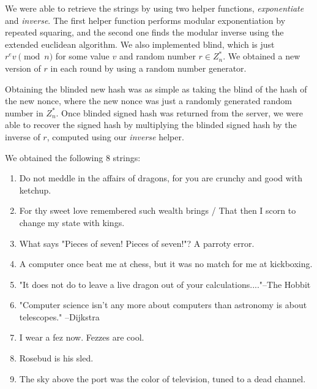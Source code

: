 
We were able to retrieve the strings by using two helper functions, \emph{exponentiate} and \emph{inverse}. The first helper function performs modular exponentiation by repeated squaring, and the second one finds the modular inverse using the extended euclidean algorithm. We also implemented blind, which is just $r^e v \pmod{n}$ for some value $v$ and random number $r \in Z_{n}^*$. We obtained a new version of $r$ in each round by using a random number generator.

Obtaining the blinded new hash was as simple as taking the blind of the hash of the new nonce, where the new nonce was just a randomly generated random number in $Z_{n}^*$. Once blinded signed hash was returned from the server, we were able to recover the signed hash by multiplying the blinded signed hash by the inverse of $r$, computed using our \emph{inverse} helper.

We obtained the following 8 strings:

\begin{enumerate}
  \item Do not meddle in the affairs of dragons, for you are crunchy and good with ketchup.
  \item For thy sweet love remembered such wealth brings / That then I scorn to change my state with kings.
  \item What says "Pieces of seven!  Pieces of seven!"?  A parroty error.
  \item A computer once beat me at chess, but it was no match for me at kickboxing.
  \item "It does not do to leave a live dragon out of your calculations...."--The Hobbit
  \item "Computer science isn't any more about computers than astronomy is about telescopes." --Dijkstra
  \item I wear a fez now.  Fezzes are cool.
  \item Rosebud is his sled.
  \item The sky above the port was the color of television, tuned to a dead channel.
\end{enumerate}
